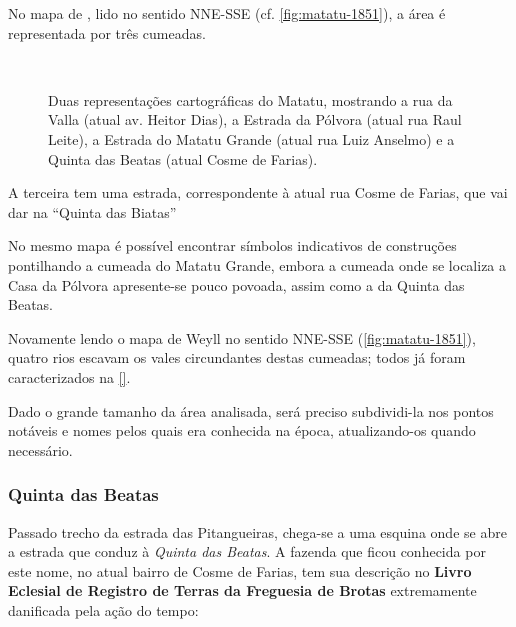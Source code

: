 No mapa de , lido no sentido NNE-SSE (cf. \autoref{fig:matatu-1851}), a área é representada por três cumeadas. 

\begin{figure}[!htp]
\centering
{}
\  %
\caption{Duas representações cartográficas do Matatu, mostrando a rua da Valla (atual av. Heitor Dias), a Estrada da Pólvora (atual rua Raul Leite), a Estrada do Matatu Grande (atual rua Luiz Anselmo) e a Quinta das Beatas (atual Cosme de Farias).}
\end{figure}

A terceira tem uma estrada, correspondente à atual rua Cosme de Farias, que vai dar na ``Quinta das Biatas''
 
No mesmo mapa é possível encontrar símbolos indicativos de construções pontilhando a cumeada do Matatu Grande, embora a cumeada onde se localiza a Casa da Pólvora apresente-se pouco povoada, assim como a da Quinta das Beatas.

Novamente lendo o mapa de Weyll no sentido NNE-SSE (\autoref{fig:matatu-1851}), quatro rios escavam os vales circundantes destas cumeadas; todos já foram caracterizados na \autoref{}. 

Dado o grande tamanho da área analisada, será preciso subdividi-la nos pontos notáveis e nomes pelos quais era conhecida na época, atualizando-os quando necessário.

\subsubsection{Quinta das Beatas}

Passado trecho da estrada das Pitangueiras, chega-se a uma esquina onde se abre a estrada que conduz à \textit{Quinta das Beatas}. A fazenda que ficou conhecida por este nome, no atual bairro de Cosme de Farias, tem sua descrição no \textbf{Livro Eclesial de Registro de Terras da Freguesia de Brotas} extremamente danificada pela ação do tempo:


